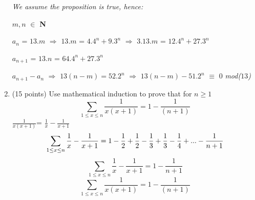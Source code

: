 \documentclass[12pt,fleqn]{article}
\begin{document}
\begin{enumerate}
\textit{We assume the proposition is true, hence:}

$m,n$ $\in$ \textbf{N}

$a_{n}$ = $13.m$ $\Rightarrow$  $13.m$ = $4.4^{n}+9.3^{n}$ $\Rightarrow$ $3.13.m$ = $12.4^{n}+27.3^{n}$

$a_{n+1}$ = $13.n$ = $64.4^{n}+27.3^{n}$

$a_{n+1}-a_{n}$ $\Rightarrow$
$13(n-m) = 52.2^{n}$ $\Rightarrow$ $13(n-m) - 51.2^{n}$ $\equiv$ $ 0 $ \textit{mod($13$)}



\item (15 points) Use mathematical induction to prove that for $ n \ge 1$ $$\sum_{1 \le x \le n}\frac{1}{x (x + 1)}=1- \frac {1}{(n + 1)}$$
$\frac{1}{x (x + 1)}$= $\frac{1}{x}- \frac{1}{x+1}$\\

$$\sum_{1 \le x \le n}\frac{1}{x}- \frac{1}{x+1}=1-\frac{1}{2}+\frac{1}{2}-\frac{1}{3}+\frac{1}{3}-\frac{1}{4}+...-\\
\frac{1}{n+1}$$
$$\sum_{1 \le x \le n}\frac{1}{x}- \frac{1}{x+1}=1-\frac{1}{n+1}$$
$$\sum_{1 \le x \le n}\frac{1}{x (x + 1)}=1- \frac {1}{(n + 1)}$$



\end{enumerate}
\end{document}
